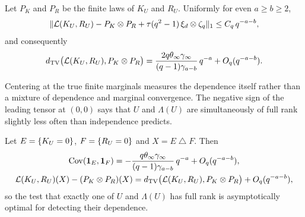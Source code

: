 \begin{theorem}\label{spn:thm:joint-defect}
Let $P_K$ and $P_R$ be the finite laws of $K_U$ and $R_U$. Uniformly for even $a\ge b\ge2$,
\[
 \lVert\mathcal L(K_U,R_U)-P_K\otimes P_R+\tau(q^2-1)\,\xi_d\otimes\zeta_q\rVert_1\le C_q\,q^{-a-b},
\]
and consequently
\[
 d_{\mathrm{TV}}\bigl(\mathcal L(K_U,R_U),P_K\otimes P_R\bigr)
 =\frac{2q\theta_\infty\gamma_\infty}{(q-1)\gamma_{a-b}}\,q^{-a}+O_q(q^{-a-b}).
\]
\end{theorem}

Centering at the true finite marginals measures the dependence itself rather than a mixture of
dependence and marginal convergence. The negative sign of the leading tensor at $(0,0)$ says that
$U$ and $\Lambda(U)$ are simultaneously of full rank slightly less often than independence
predicts.

\begin{corollary}\label{spn:cor:xor}
Let $E=\{K_U=0\}$, $F=\{R_U=0\}$ and $X=E\mathbin{\triangle}F$. Then
\begin{gather*}
 \operatorname{Cov}(\mathbf 1_E,\mathbf 1_F)
 =-\frac{q\theta_\infty\gamma_\infty}{(q-1)\gamma_{a-b}}\,q^{-a}+O_q(q^{-a-b}),\\
 \mathcal L(K_U,R_U)(X)-(P_K\otimes P_R)(X)
 =d_{\mathrm{TV}}\bigl(\mathcal L(K_U,R_U),P_K\otimes P_R\bigr)+O_q(q^{-a-b}),
\end{gather*}
so the test that exactly one of $U$ and $\Lambda(U)$ has full rank is asymptotically optimal for
detecting their dependence.
\end{corollary}


